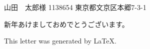 \documentclass{jletteraddress}
\begin{document}
\pagestyle{empty}

\addaddress
  {山田　太郎}{様}
  {1138654}
  {東京都文京区本郷7-3-1}
  {}

\newpage
{}

新年あけましておめでとうございます。


\begin{flushright}
  \small This letter was generated by \LaTeX.
\end{flushright}
\end{document}
